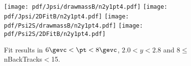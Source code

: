 \begin{figure}[H]
\begin{center}
\texttt{[image: pdf/Jpsi/drawmassB/n2y1pt4.pdf]}
\texttt{[image: pdf/Jpsi/2DFitB/n2y1pt4.pdf]}
\vspace*{-0.5cm}
\texttt{[image: pdf/Psi2S/drawmassB/n2y1pt4.pdf]}
\texttt{[image: pdf/Psi2S/2DFitB/n2y1pt4.pdf]}
\vspace*{-0.5cm}
\end{center}
\caption{Fit results in $6\gevc<\pt<8\gevc$, $2.0<y<2.8$ and 8$\leq$nBackTracks$<$15.}
\label{Fitn2y1pt4}
\end{figure}
